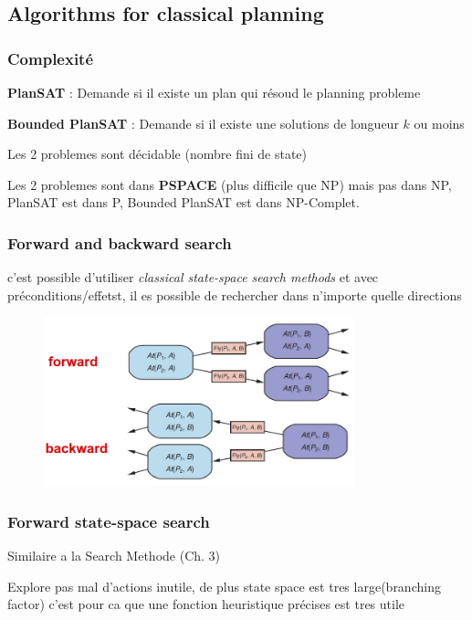 \documentclass[12pt]{article}
\begin{document}
	\subsection{Algorithms for classical planning}
		\subsubsection{Complexité}
			\textbf{PlanSAT} : Demande si il existe un plan qui résoud le planning probleme
			
			\textbf{Bounded PlanSAT} : Demande si il existe une solutions de longueur $k$ ou moins
			
			Les 2 problemes sont décidable (nombre fini de state)
			
			Les 2 problemes sont dans \textbf{PSPACE} (plus difficile que NP) mais pas dans NP, PlanSAT est dans P, Bounded PlanSAT est dans NP-Complet.
			
		\subsubsection{Forward and backward search}
			c'est possible d'utiliser \textit{classical state-space search methods} et avec préconditions/effetst, il es possible de rechercher dans n'importe quelle directions
			
			\begin{figure}[htp]	
				\centering
				\includegraphics[width=0.8\textwidth]{img/FBSearch.png}
			\end{figure}
			
		\subsubsection{Forward state-space search}
			Similaire a la Search Methode (Ch. 3)
			
			Explore pas mal d'actions inutile, de plus state space est tres large(branching factor) c'est pour ca que une fonction heuristique précises est tres utile
			
\end{document}
